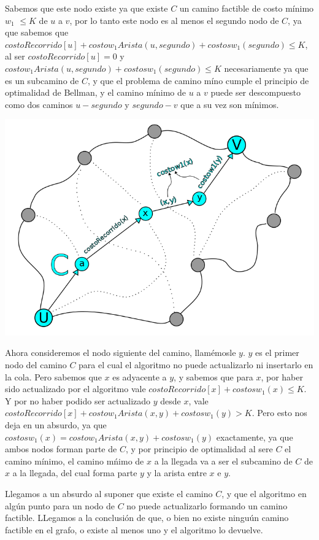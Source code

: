 \vspace{2mm}

Sabemos que este nodo existe ya que existe $C$ un camino factible de costo m\'inimo $w_1$ $\leq K$ de $u$ a $v$, por lo tanto este nodo es al menos el segundo nodo de $C$, ya que sabemos que $costoRecorrido[u] + costow_1Arista(u,segundo) + costosw_1(segundo) \leq K $, al ser $costoRecorrido[u]=0$ y $costow_1Arista(u,segundo) + costosw_1(segundo)\leq K$ necesariamente ya que es un subcamino de $C$, y que el problema de camino m\'ino cumple el principio de optimalidad de Bellman, y el camino m\'inimo de $u$ a $v$ puede ser descompuesto como dos caminos $u-segundo$ y $segundo-v$ que a su vez son m\'inimos.

\vspace{2mm}

\includegraphics[scale=0.6]{img/caminoC.png}

Ahora consideremos el nodo siguiente del camino, llam\'emosle $y$. $y$ es el primer nodo del camino $C$ para el cual el algoritmo no puede actualizarlo ni insertarlo en la cola. Pero sabemos que $x$ es adyacente a $y$, y sabemos que para $x$, por haber sido actualizado por el algoritmo vale $costoRecorrido[x] + costosw_1(x) \leq K$. Y por no haber podido ser actualizado $y$ desde $x$, vale $costoRecorrido[x] + costow_1Arista(x,y) + costosw_1(y)  > K$. Pero esto nos deja en un absurdo, ya que $costosw_1(x)=  costow_1Arista(x,y) + costosw_1(y)$ exactamente, ya que ambos nodos forman parte de $C$, y por principio de optimalidad al sere $C$ el camino m\'inimo,  el camino m\'nimo de $x$ a la llegada va a ser el subcamino de $C$ de $x$ a la llegada, del cual forma parte $y$ y la arista entre $x$ e $y$.	

\vspace{2mm}

Llegamos a un absurdo al suponer que existe el camino $C$, y que el algoritmo en alg\'un punto para un nodo de $C$ no puede actualizarlo formando un camino factible. LLegamos a la conclusi\'on de que, o bien no existe ningu\'un camino factible en el grafo, o existe al menos uno y el algoritmo lo devuelve.

